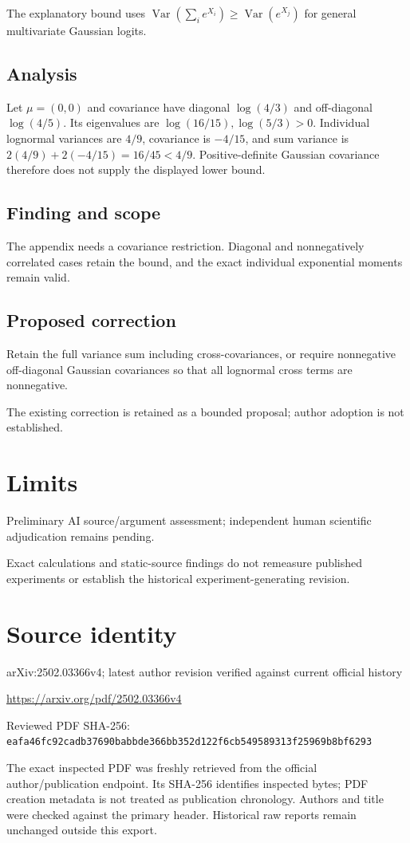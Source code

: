 \documentclass[11pt]{article}
\begin{document}
The explanatory bound uses \(\operatorname{Var}(\sum_ie^{X_i})\geq\operatorname{Var}(e^{X_j})\) for general multivariate Gaussian logits.

\subsection*{Analysis}

Let \(\mu=(0,0)\) and covariance have diagonal \(\log(4/3)\) and off-diagonal \(\log(4/5)\). Its eigenvalues are \(\log(16/15),\log(5/3)>0\). Individual lognormal variances are \(4/9\), covariance is \(-4/15\), and sum variance is \(2(4/9)+2(-4/15)=16/45<4/9\). Positive-definite Gaussian covariance therefore does not supply the displayed lower bound.

\subsection*{Finding and scope}

The appendix needs a covariance restriction. Diagonal and nonnegatively correlated cases retain the bound, and the exact individual exponential moments remain valid.

\subsection*{Proposed correction}

Retain the full variance sum including cross-covariances, or require nonnegative off-diagonal Gaussian covariances so that all lognormal cross terms are nonnegative.

The existing correction is retained as a bounded proposal; author adoption is not established.

\section*{Limits}

Preliminary AI source/argument assessment; independent human scientific adjudication remains pending.\par

Exact calculations and static-source findings do not remeasure published experiments or establish the historical experiment-generating revision.\par

\section*{Source identity}

arXiv:2502.03366v4; latest author revision verified against current official history

\url{https://arxiv.org/pdf/2502.03366v4}

Reviewed PDF SHA-256: \nolinkurl{eafa46fc92cadb37690babbde366bb352d122f6cb549589313f25969b8bf6293}

The exact inspected PDF was freshly retrieved from the official author/publication endpoint. Its SHA-256 identifies inspected bytes; PDF creation metadata is not treated as publication chronology. Authors and title were checked against the primary header. Historical raw reports remain unchanged outside this export.
\end{document}
